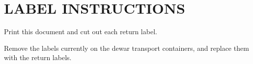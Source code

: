 \documentclass[letterpaper,6pt]{report}
\begin{document}
{%

    \vspace{0.2in}

    \begin{minipage}{\textwidth}
        \section*{LABEL INSTRUCTIONS}
        
        Print this document and cut out each return label.  
        
        Remove the labels currently on the dewar transport containers, and replace them with the return labels.

    \end{minipage}

}
\end{document}
